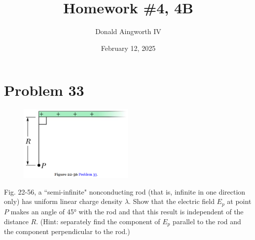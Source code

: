 \documentclass[12pt]{article}
\title{Homework \#4, 4B}
\author{Donald Aingworth IV}
\date{February 12, 2025}
\begin{document}

\maketitle


\section{Problem 33}
\begin{figure}
    \vspace{-30pt}
    \includegraphics[width=0.5\textwidth]{picture_1.png} 
\end{figure}
Fig. 22-56, a ``semi-infinite" nonconducting rod (that is, infinite in one direction only) has uniform linear charge density $\lambda$. Show that the electric field $E_p$ at point $P$ makes an angle of 45\unit{\degree} with the rod and that this result is independent of the distance $R$. (Hint: separately find the component of $E_p$ parallel to the rod and the component perpendicular to the rod.)
\end{document}
